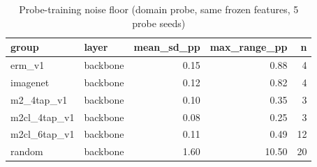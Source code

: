 \begin{table}
\caption{Probe-training noise floor (domain probe, same frozen features, 5 probe seeds)}
\label{tab:leak_noise_floor}
\begin{tabular}{llrrr}
\toprule
group & layer & mean\_sd\_pp & max\_range\_pp & n \\
\midrule
erm\_v1 & backbone & 0.15 & 0.88 & 4 \\
imagenet & backbone & 0.12 & 0.82 & 4 \\
m2\_4tap\_v1 & backbone & 0.10 & 0.35 & 3 \\
m2cl\_4tap\_v1 & backbone & 0.08 & 0.25 & 3 \\
m2cl\_6tap\_v1 & backbone & 0.11 & 0.49 & 12 \\
random & backbone & 1.60 & 10.50 & 20 \\
\bottomrule
\end{tabular}
\end{table}
